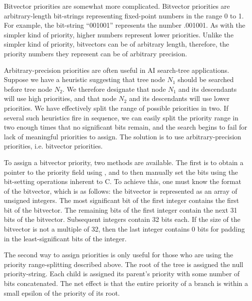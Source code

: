 Bitvector priorities are somewhat more complicated.  Bitvector
priorities are arbitrary-length bit-strings representing fixed-point
numbers in the range 0 to 1.  For example, the bit-string ``001001''
represents the number .001001\raisebox{-.5ex}{\scriptsize binary}.  As
with the simpler kind of priority, higher numbers represent lower
priorities.  Unlike the simpler kind of priority, bitvectors can be of
arbitrary length, therefore, the priority numbers they represent can
be of arbitrary precision.

Arbitrary-precision priorities
are often useful in AI search-tree applications.  Suppose we have a
heuristic suggesting that tree node $N_1$ should be searched before
tree node $N_2$.  We therefore designate that node $N_1$ and its
descendants will use high priorities, and that node $N_2$ and its
descendants will use lower priorities.  We have effectively split the
range of possible priorities in two.  If several such heuristics fire
in sequence, we can easily split the priority range  in two enough times that no significant bits remain,
and the search begins to fail for lack of meaningful priorities to
assign.  The solution is to use arbitrary-precision priorities,
i.e. bitvector priorities.

To assign a bitvector priority, two methods are available.  The
first is to obtain a pointer to the priority field using  ,
and to then manually set the bits using the bit-setting operations
inherent to C.  To achieve this, one must know the format
 of the
bitvector, which is as follows: the bitvector is represented as an
array of unsigned integers.  The most significant bit of the first
integer contains the first bit of the bitvector.  The remaining bits
of the first integer contain the next 31 bits of the bitvector.
Subsequent integers contain 32 bits each.  If the size of the
bitvector is not a multiple of 32, then the last integer contains 0
bits for padding in the least-significant bits of the integer.

The second way to assign priorities is only useful for those who are
using the priority range-splitting
described above.  The root of the tree is assigned the null
priority-string.  Each child is assigned its parent's priority with
some number of bits concatenated.  The net effect is that the entire
priority of a branch is within a small epsilon of the priority of its
root.

